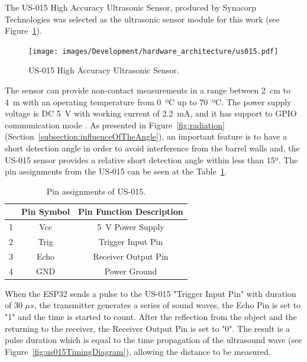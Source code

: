 The US-015 High Accuracy Ultrasonic Sensor, produced by Synacorp Technologies was selected as the ultrasonic sensor module for this work (see Figure~\ref{fig:us015}).

\begin{figure}[h!]
    \centering
    \texttt{[image: images/Development/hardware\_architecture/us015.pdf]}
    \caption{US-015 High Accuracy Ultrasonic Sensor.}
    \label{fig:us015}
\end{figure}

The sensor can provide non-contact measurements in a range between 2~cm to 4~m with an operating temperature from 0~ºC up to 70~ºC. The power supply voltage is \gls{DC} 5~V with working current of 2.2~mA, and it has support to \gls{GPIO} communication mode \cite{datasheet:US015}. As presented in Figure~\ref{fig:radiation} (Section~\ref{subsection:influenceOfTheAngle}), an important feature is to have a short detection angle in order to avoid interference from the barrel walls and, the US-015 sensor provides a relative short detection angle within less than 15º. The pin assignments from the US-015 can be seen at the Table~\ref{tab:us015_pin}. 

\begin{table}[h!]
    \centering
    \begin{tabular}{@{}lcc@{}}
        \toprule
         & \textbf{Pin Symbol} & \textbf{Pin Function Description} \\ \midrule
        \rowcolor[HTML]{EFEFEF} 
        1 & Vcc & 5~V Power Supply \\
        2 & Trig & Trigger Input Pin \\
        \rowcolor[HTML]{EFEFEF} 
        3 & Echo & Receiver Output Pin \\
        4 & GND & Power Ground \\ \bottomrule
    \end{tabular}
    \caption{Pin assignments of US-015.}
    \label{tab:us015_pin}
\end{table}

When the ESP32 sends a pulse to the US-015 "Trigger Input Pin" with duration of 30 \begin{math}\mu s\end{math}, the transmitter generates a series of sound waves, the Echo Pin is set to "1" and the time is started to count. After the reflection from the object and the returning to the receiver, the Receiver Output Pin is set to "0". The result is a pulse duration which is equal to the time propagation of the ultrasound wave (see Figure~\ref{fig:us015TimingDiagram}), allowing the distance to be measured.

